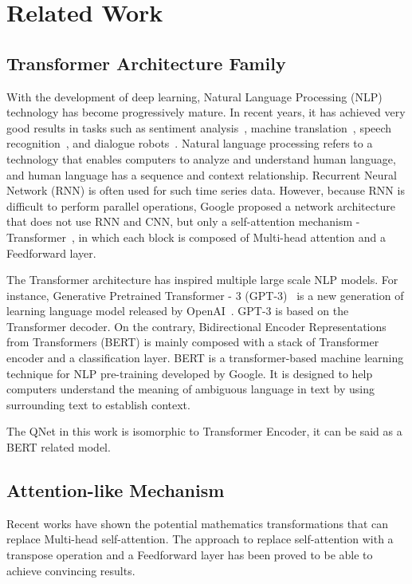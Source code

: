 \section{Related Work}

\subsection{Transformer Architecture Family}

With the development of deep learning, Natural Language Processing (NLP) technology has become progressively mature. In recent years, it has achieved very good results in tasks such as sentiment analysis~\cite{}, machine translation~\cite{}, speech recognition~\cite{}, and dialogue robots~\cite{}.
Natural language processing refers to a technology that enables computers to analyze and understand human language, and human language has a sequence and context relationship. Recurrent Neural Network (RNN) is often used for such time series data. However, because RNN is difficult to perform parallel operations, Google proposed a network architecture that does not use RNN and CNN, but only a self-attention mechanism - Transformer~\cite{NIPS2017_3f5ee243}, in which each block is composed of Multi-head attention and a Feedforward layer.

The Transformer architecture has inspired multiple large scale NLP models. For instance, Generative Pretrained Transformer - 3 (GPT-3)~\cite{NEURIPS2020_1457c0d6} is a new generation of learning language model released by OpenAI~\cite{}. GPT-3 is based on the Transformer decoder. On the contrary, Bidirectional Encoder Representations from Transformers (BERT) is mainly composed with a stack of Transformer encoder and a classification layer. BERT is a transformer-based machine learning technique for NLP pre-training developed by Google. It is designed to help computers understand the meaning of ambiguous language in text by using surrounding text to establish context.

The QNet in this work is isomorphic to Transformer Encoder, it can be said as a BERT related model.

\subsection{Attention-like Mechanism}

Recent works have shown the potential mathematics transformations that can replace Multi-head self-attention. The approach to replace self-attention with a transpose operation and a Feedforward layer has been proved to be able to achieve convincing results.

